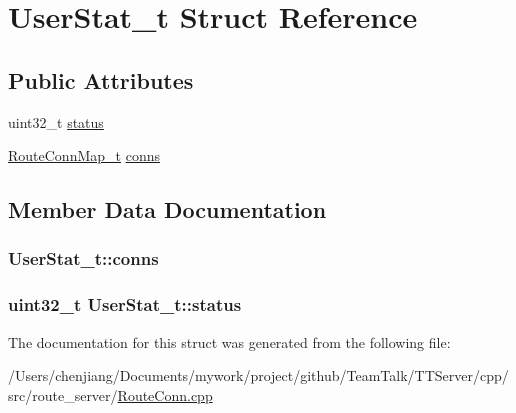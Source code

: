 \hypertarget{struct_user_stat__t}{}\section{User\+Stat\+\_\+t Struct Reference}
\label{struct_user_stat__t}
\subsection*{Public Attributes}
\begin{DoxyCompactItemize}
\item 
uint32\+\_\+t \hyperlink{struct_user_stat__t_ac7b0154374b06d2b6cd1f25b130e72a0}{status}
\item 
\hyperlink{_route_conn_8cpp_a7ff97af342bcc55f2d9dbb3700509821}{Route\+Conn\+Map\+\_\+t} \hyperlink{struct_user_stat__t_a416eb264b5aa7b0de4e74e36625cb8f3}{conns}
\end{DoxyCompactItemize}


\subsection{Member Data Documentation}
\hypertarget{struct_user_stat__t_a416eb264b5aa7b0de4e74e36625cb8f3}{}
\subsubsection[{conns}]{ User\+Stat\+\_\+t\+::conns}\label{struct_user_stat__t_a416eb264b5aa7b0de4e74e36625cb8f3}
\hypertarget{struct_user_stat__t_ac7b0154374b06d2b6cd1f25b130e72a0}{}
\subsubsection[{status}]{\setlength{\rightskip}{0pt plus 5cm}uint32\+\_\+t User\+Stat\+\_\+t\+::status}\label{struct_user_stat__t_ac7b0154374b06d2b6cd1f25b130e72a0}


The documentation for this struct was generated from the following file\+:\begin{DoxyCompactItemize}
\item 
/\+Users/chenjiang/\+Documents/mywork/project/github/\+Team\+Talk/\+T\+T\+Server/cpp/src/route\+\_\+server/\hyperlink{_route_conn_8cpp}{Route\+Conn.\+cpp}\end{DoxyCompactItemize}
